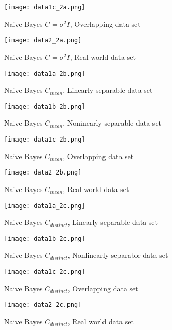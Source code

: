 \begin{figure}[h]
\texttt{[image: data1c\_2a.png]}
\caption{Naive Bayes $C = \sigma^2 I$, Overlapping data set}
\end{figure}

\begin{figure}[h]
\texttt{[image: data2\_2a.png]}
\caption{Naive Bayes $C = \sigma^2 I$, Real world data set}
\end{figure}



\begin{figure}[h]
\texttt{[image: data1a\_2b.png]}
\caption{Naive Bayes $C_{mean}$, Linearly separable data set}
\end{figure}

\begin{figure}[h]
\texttt{[image: data1b\_2b.png]}
\caption{Naive Bayes $C_{mean}$, Noninearly separable data set}
\end{figure}

\begin{figure}[h]
\texttt{[image: data1c\_2b.png]}
\caption{Naive Bayes $C_{mean}$, Overlapping data set}
\end{figure}

\begin{figure}[h]
\texttt{[image: data2\_2b.png]}
\caption{Naive Bayes $C_{mean}$, Real world data set}
\end{figure}



\begin{figure}[h]
\texttt{[image: data1a\_2c.png]}
\caption{Naive Bayes $C_{distinct}$, Linearly separable data set}
\end{figure}

\begin{figure}[h]
\texttt{[image: data1b\_2c.png]}
\caption{Naive Bayes $C_{distinct}$, Nonlinearly separable data set}
\end{figure}

\begin{figure}[h]
\texttt{[image: data1c\_2c.png]}
\caption{Naive Bayes $C_{distinct}$, Overlapping data set}
\end{figure}

\begin{figure}[h]
\texttt{[image: data2\_2c.png]}
\caption{Naive Bayes $C_{distinct}$, Real world data set}
\end{figure}

